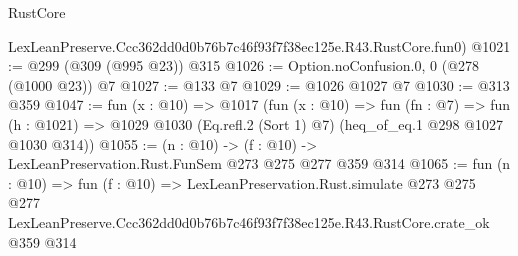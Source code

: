 \begin{lexlean}{RustCore}
\begin{coremodule}
    LexLeanPreserve.Ccc362dd0d0b76b7c46f93f7f38ec125e.R43.RustCore.fun0)
@1021 := @299 (@309 (@995 @23)) @315
@1026 := Option.noConfusion.{0, 0} (@278 (@1000 @23)) @7
@1027 := @133 @7
@1029 := @1026 @1027 @7
@1030 := @313 @359
@1047 := fun (x : @10) =>
  @1017
    (fun (x : @10) =>
    fun (fn : @7) =>
    fun (h : @1021) => @1029 @1030 (Eq.refl.{2} (Sort 1) @7) (heq_of_eq.{1} @298 @1027 @1030 @314))
@1055 := (n : @10) -> (f : @10) -> LexLeanPreservation.Rust.FunSem @273 @275 @277 @359 @314
@1065 := fun (n : @10) =>
  fun (f : @10) =>
  LexLeanPreservation.Rust.simulate
    @273
    @275
    @277
    LexLeanPreserve.Ccc362dd0d0b76b7c46f93f7f38ec125e.R43.RustCore.crate_ok
    @359
    @314
\end{coremodule}
\end{lexlean}
